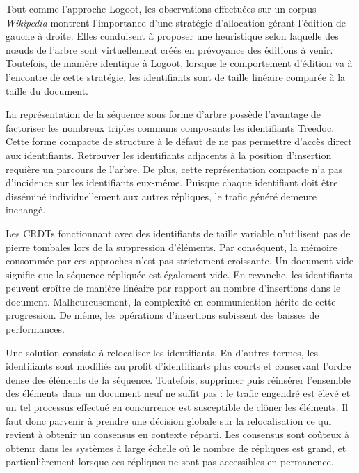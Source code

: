 
\noindent Tout comme l'approche Logoot, les observations effectuées sur un
corpus \emph{Wikipedia} montrent l'importance d'une stratégie d'allocation
gérant l'édition de gauche à droite. Elles conduisent à proposer une heuristique
selon laquelle des nœuds de l'arbre sont virtuellement créés en prévoyance des
éditions à venir. Toutefois, de manière identique à Logoot, lorsque le
comportement d'édition va à l'encontre de cette stratégie, les identifiants sont
de taille linéaire comparée à la taille du document.

\noindent La représentation de la séquence sous forme d'arbre possède l'avantage
de factoriser les nombreux triples communs composants les identifiants
Treedoc. Cette forme compacte de structure à le défaut de ne pas permettre
d'accès direct aux identifiants. Retrouver les identifiants adjacents à la
position d'insertion requière un parcours de l'arbre. De plus, cette
représentation compacte n'a pas d'incidence sur les identifiants
eux-même. Puisque chaque identifiant doit être disséminé individuellement aux
autres répliques, le trafic généré demeure inchangé.

Les CRDTs fonctionnant avec des identifiants de taille variable n'utilisent pas
de pierre tombales lors de la suppression d'éléments. Par conséquent, la mémoire
consommée par ces approches n'est pas strictement croissante. Un document vide
signifie que la séquence répliquée est également vide. En revanche, les
identifiants peuvent croître de manière linéaire par rapport au nombre
d'insertions dans le document. Malheureusement, la complexité en communication
hérite de cette progression. De même, les opérations d'insertions subissent des
baisses de performances. 

Une solution consiste à relocaliser les identifiants. En d'autres termes, les
identifiants sont modifiés au profit d'identifiants plus courts et conservant
l'ordre dense des éléments de la séquence. Toutefois, supprimer puis réinsérer
l'ensemble des éléments dans un document neuf ne suffit pas : le trafic engendré
est élevé et un tel processus effectué en concurrence est susceptible de clôner
les éléments. Il faut donc parvenir à prendre une décision globale sur la
relocalisation ce qui revient à obtenir un consensus en contexte réparti. Les
consensus sont coûteux à obtenir dans les systèmes à large échelle où le nombre
de répliques est grand, et particulièrement lorsque ces répliques ne sont pas
accessibles en permanence.

